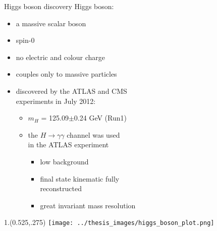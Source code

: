 \documentclass[10pt,UKenglish, leqno, xcolor = dvipsnames]{beamer}
\begin{document}
	\begin{frame}{Higgs boson discovery}
		\vfill
		Higgs boson:
		\begin{itemize}
			\item a massive scalar boson
			\item spin-0
			\item no electric and colour charge
			\item couples only to massive particles
			\item discovered by the ATLAS and CMS\\ experiments in July 2012:
			\begin{itemize}
				\item $m_H$ = 125.09$\pm$0.24 GeV (Run1)
				\item the $H \to \gamma\gamma$ channel was used\\ in the ATLAS experiment
				\begin{itemize}
					\item low background
					\item final state kinematic fully\\ reconstructed
					\item great invariant mass resolution
				\end{itemize}
			\end{itemize}
		\end{itemize}
		\vfill
		\begin{textblock}{1.}(0.525,.275)
			\texttt{[image: ../thesis\_images/higgs\_boson\_plot.png]}
		\end{textblock}
	\end{frame}
\end{document}
